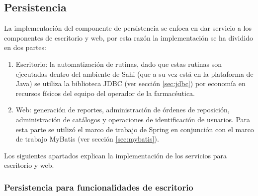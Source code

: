 \subsection{Persistencia}\label{sec:persistence}
La implementación del componente de persistencia se enfoca en dar servicio a los componentes de escritorio y web, por esta razón la implementación se ha dividido en dos partes:
\begin{enumerate}
 	\item Escritorio: la automatización de rutinas, dado que estas rutinas son ejecutadas dentro del ambiente de Sahi (que a su vez está en la plataforma de Java) se utiliza la biblioteca JDBC (ver sección \ref{sec:jdbc}) por economía en recursos físicos del equipo del operador de la farmacéutica.
 	\item Web: generación de reportes, administración de órdenes de reposición, administración de catálogos y operaciones de identificación  de usuarios. Para esta parte se utilizó el marco de trabajo de Spring en conjunción con el marco de trabajo MyBatis (ver sección \ref{sec:mybatis}).
\end{enumerate}
Los siguientes apartados explican la implementación de los servicios para escritorio y web.

\subsubsection{Persistencia para funcionalidades de escritorio}
